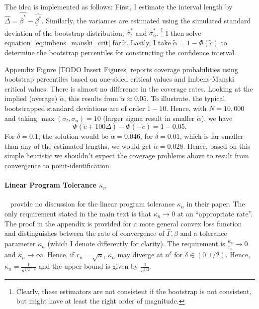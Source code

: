\documentclass[12pt,a4paper,english]{article} %
\numberwithin{equation}{section}
\theoremstyle{definition}
\theoremstyle{remark}
\theoremstyle{plain}
\begin{document}
The idea is implemented as follows:
First, I estimate the interval length by $\hat{\Delta} = \hat{\overline{\beta}^*} - \hat{\underline{\beta}^*}$.
Similarly, the variances are estimated using the simulated standard deviation of the bootstrap distribution, $\hat{\sigma}_l^*$ and $\hat{\sigma}_u^*$.
\footnote{Clearly, these estimators are not consistent if the bootstrap is not consistent, but might have at least the right order of magnitude.}
I then solve equation~\ref{eq:imbens_manski_crit} for $\tilde{c}$.
Lastly, I take $\tilde{\alpha} = 1 - \Phi(\tilde{c})$ to determine the bootstrap percentiles for constructing the confidence interval.

Appendix Figure [TODO Insert Figures] reports coverage probabilities using bootstrap percentiles based on one-sided critical values and Imbens-Manski critical values.
There is almost no difference in the coverage rates.
Looking at the implied (average) $\tilde{\alpha}$, this results from $\tilde{\alpha} \approx 0.05$.
To illustrate, the typical bootstrapped standard deviations are of order $1-10$.
Hence, with $N = 10,000$ and taking $\max(\sigma_l, \sigma_u)=10$ (larger sigma result in smaller $\tilde{\alpha}$), we have
\begin{equation*}
  \Phi\left(\tilde{c} + 100\Delta\right) - \Phi\left(-\tilde{c}\right) = 1 - 0.05.
\end{equation*}
For $\delta=0.1$, the solution would be $\tilde{\alpha} = 0.046$, for $\delta=0.01$, which is far smaller than any of the estimated lengths, we would get $\tilde{\alpha} = 0.028$.
Hence, based on this simple heuristic we shouldn't expect the coverage problems above to result from convergence to point-identification.


\paragraph{Linear Program Tolerance $\kappa_n$}
~\cite{mogstad2018using} provide no discussion for the linear program tolerance $\kappa_n$ in their paper.
The only requirement stated in the main text is that $\kappa_n \to 0$ at an ``appropriate rate''.
The proof in the appendix is provided for a more general convex loss function and distinguishes between the rate of convergence of $\hat{\Gamma}, \hat{\beta}$ and a tolerance parameter $\tilde{\kappa}_n$ (which I denote differently for clarity).
The requirement is $\frac{\tilde{\kappa}_n}{r_n} \to 0$ and $\tilde{\kappa_n}\to \infty$. Hence, if $r_n = \sqrt{n}$, $\tilde{\kappa}_n$ may diverge at $n^\delta$ for $\delta \in (0, 1/2)$.
Hence, $\kappa_n = \frac{1}{n^{1/2 - \delta}}$ and the upper bound is given by $\frac{1}{n^{1/2}}$.
\end{document}
